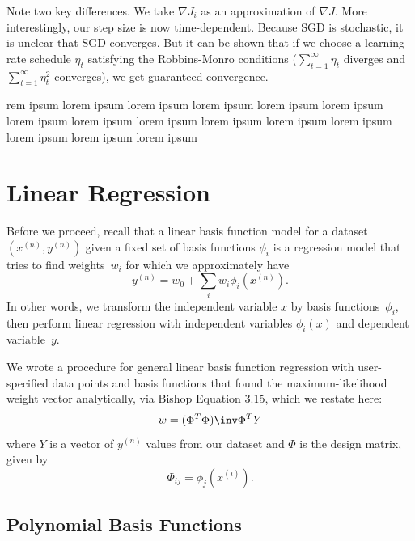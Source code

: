 \documentclass{article}
\begin{document}
\begin{multicols}{2}
Note two key differences. We take $\nabla J_i$ as an approximation of $\nabla J$. More interestingly, our step size is now time-dependent. Because SGD is stochastic, it is unclear that SGD converges. But it can be shown that if we choose a learning rate schedule $\eta_t$ satisfying the Robbins-Monro conditions ($\sum_{t=1}^\infty \eta_t$ diverges and $\sum_{t=1}^\infty \eta_t^2$ converges), we get guaranteed convergence.


rem ipsum lorem ipsum lorem ipsum lorem ipsum lorem ipsum lorem ipsum lorem ipsum lorem ipsum lorem ipsum lorem ipsum lorem ipsum lorem ipsum lorem ipsum lorem ipsum lorem ipsum 




\section{Linear Regression}

Before we proceed, recall that a linear basis function model for a dataset $(x^{(n)},y^{(n)})$ given a fixed set of basis functions $\phi_i$ is a regression model that tries to find weights~$w_i$ for which we approximately have
\[ y^{(n)} = w_0 + \sum_i w_i \phi_i(x^{(n)}). \]
In other words, we transform the independent variable $x$ by basis functions~$\phi_i$, then perform linear regression with independent variables $\phi_i(x)$ and dependent variable~$y$.

We wrote a procedure for general linear basis function regression with user-specified data points and basis functions that found the maximum-likelihood weight vector analytically, via Bishop Equation 3.15, which we restate here:
\begin{equation}
\label{eq:max-likelihood-weights}
w = (\Phi^T\Phi)\inv\Phi^T Y
\end{equation}
where $Y$ is a vector of $y^{(n)}$ values from our dataset and $\Phi$ is the design matrix, given by
\begin{equation}
\Phi_{ij} = \phi_j(x^{(i)}).
\end{equation}

\subsection{Polynomial Basis Functions}


\end{multicols}
\end{document}
